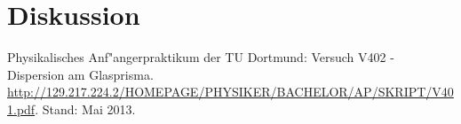 \section{Diskussion}
\label{diskussion}

\begin{thebibliography}{9}
	 Physikalisches Anf"angerpraktikum der TU Dortmund: Versuch V402 - Dispersion am Glasprisma. \url{http://129.217.224.2/HOMEPAGE/PHYSIKER/BACHELOR/AP/SKRIPT/V401.pdf}. Stand: Mai 2013.
\end{thebibliography}
